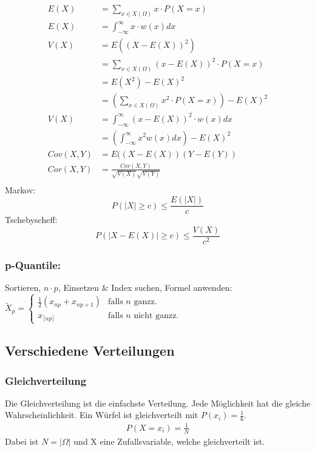 \documentclass[a4paper, 8pt, landscape]{extarticle}
\let\oldint\int
\renewcommand{\int}{\ensuremath{\textstyle\oldint}}
\let\oldsum\sum
\renewcommand{\sum}{\ensuremath{\textstyle\oldsum}}
\begin{document}
\begin{multicols*}{5}
		    \begin{align*}
		    	E(X) &= \sum_{x \in X(\Omega)} x \cdot P(X = x)\\
		    	E(X) &= \int_{-\infty}^{\infty} x \cdot w(x) dx\\
		    	V(X) &= E((X-E(X))^2)\\
		    	&= \sum_{x \in X(\Omega)} (x - E(X))^2 \cdot P(X = x)\\
		    	&= E(X^2)-E(X)^2\\
			    &= \left(\sum_{x \in X(\Omega)} x^2 \cdot P(X = x)\right) - E(X)^2\\
		    	V(X) &= \int_{-\infty}^{\infty} (x - E(X))^2 \cdot w(x) dx\\
		    	&= \left(\int_{-\infty}^{\infty} x^2 w(x) dx \right) - E(X)^2	\\
		    	Cov(X,Y)&=E((X-E(X))(Y-E(Y))\\
		    	Cor(X,Y)&=\frac{Cov(X,Y)}{\sqrt{V(X)}\sqrt{V(Y)}}\\
		    \end{align*}
		    Markov: $$P(|X|\geq c) \leq \frac{E(|X|)}{c}$$
		    Tschebyscheff:$$P(|X-E(X)|\geq c)\leq\frac{V(X)}{c^2}$$
		    \subsubsection{p-Quantile:}
		    Sortieren, $n\cdot p$, Einsetzen \& Index suchen, Formel anwenden:\\
			$\widetilde{X}_p=
			\begin{cases}
			\frac{1}{2}(x_{np}+x_{np+1}) & \text{falls } n \text{ ganzz.}\\
			x_{\lceil{np}\rceil} & \text{falls } n \text{ nicht ganzz.}
			\end{cases}$
	    \subsection{Verschiedene Verteilungen}
			\subsubsection{Gleichverteilung}
				Die Gleichverteilung ist die einfachste Verteilung. Jede Möglichkeit hat die gleiche Wahrscheinlichkeit. Ein Würfel ist gleichverteilt mit $P(x_i) = \frac{1}{6}$.\\
				\begin{align*}
					P(X = x_i) = \frac{1}{N}
				\end{align*}
				Dabei ist $N = |\Omega|$ und X eine Zufallsvariable, welche gleichverteilt ist.

\end{multicols*}
\end{document}
